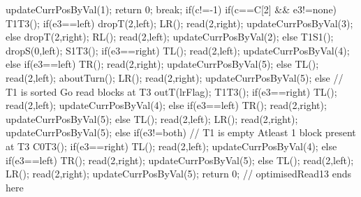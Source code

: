 {{{                {
                    updateCurrPosByVal(1);
                    return 0;
                }
                break;
        }
        if(c!=-1)
        {
            if(c==C[2] && e3!=none)
            {
                T1T3();
                if(e3==left)
                {
                    dropT(2,left);
                    LR();
                    read(2,right);
                    updateCurrPosByVal(3);
                }
                else
                {
                    dropT(2,right);
                    RL();
                    read(2,left);
                    updateCurrPosByVal(2);
                }
            }
            else
            {
                T1S1();
                dropS(0,left);
                S1T3();
                if(e3==right)
                {
                    TL();
                    read(2,left);
                    updateCurrPosByVal(4);
                }
                else if(e3==left)
                {
                    TR();
                    read(2,right);
                    updateCurrPosByVal(5);
                }
                else
                {
                    TL();
                    read(2,left);
                    aboutTurn();
                    LR();
                    read(2,right);
                    updateCurrPosByVal(5);
                }
            }
        }
        else // T1 is sorted Go read blocks at T3
        {
			outT(lrFlag);
            T1T3();
            if(e3==right)
            {
                TL();
                read(2,left);
                updateCurrPosByVal(4);
            }
            else if(e3==left)
            {
                TR();
                read(2,right);
                updateCurrPosByVal(5);
            }
            else
            {
                TL();
                read(2,left);
                LR();
                read(2,right);
                updateCurrPosByVal(5);
            }
        }
    }
    else if(e3!=both) // T1 is empty Atleast 1 block present at T3
    {
        C0T3();
        if(e3==right)
        {
            TL();
            read(2,left);
            updateCurrPosByVal(4);
        }
        else if(e3==left)
        {
            TR();
            read(2,right);
            updateCurrPosByVal(5);
        }
        else
        {
            TL();
            read(2,left);
            LR();
            read(2,right);
            updateCurrPosByVal(5);
        }
    }
    return 0;
}
// optimisedRead13 ends here



